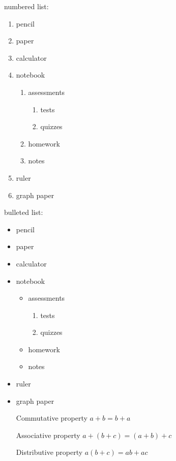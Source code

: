 \documentclass[11]{article}
\begin{document}
	numbered list:
	
	\begin{enumerate} %
		\item pencil
		\item paper
		\item calculator
		\item notebook
			\begin{enumerate}
				\item assessments
					\begin{enumerate}
						\item tests
						\item quizzes
					\end{enumerate}
				\item homework
				\item notes
			\end{enumerate}
		\item ruler
		\item graph paper
	\end{enumerate}
	
	bulleted list:
	\begin{itemize} %
		\item pencil
		\item paper
		\item calculator
		\item notebook
			\begin{itemize}
				\item assessments
					\begin{enumerate}
						\item tests
						\item quizzes
					\end{enumerate}
				\item homework
				\item notes
			\end{itemize}
		\item ruler
		\item graph paper
	\end{itemize}
	
	\begin{enumerate} %
		\item[Commutative property] $ a + b = b + a $
		\item[Associative property] $ a + (b + c) = (a + b) + c $
		\item[Distributive property] $ a (b + c) = ab + ac $
	\end{enumerate}
\end{document}
